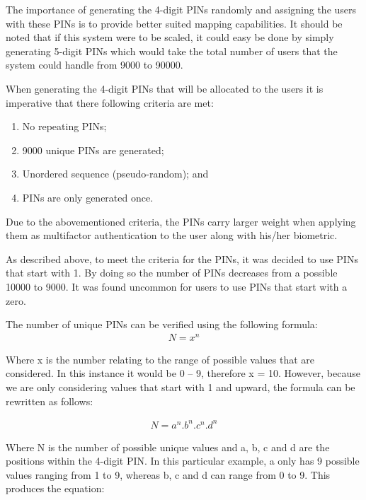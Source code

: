 The importance of generating the 4-digit PINs randomly and assigning the users with these PINs is to provide better suited mapping capabilities. It should be noted that if this system were to be scaled, it could easy be done by simply generating 5-digit PINs which would take the total number of users that the system could handle from 9000 to 90000.

When generating the 4-digit PINs that will be allocated to the users it is imperative that there following criteria are met:

\begin{enumerate}[label=\roman*.]
    \item No repeating PINs;
    \item 9000 unique PINs are generated;
    \item Unordered sequence (pseudo-random); and
    \item PINs are only generated once.
\end{enumerate}





Due to the abovementioned criteria, the PINs carry larger weight when applying them as multifactor authentication to the user along with his/her biometric. 

As described above, to meet the criteria for the PINs, it was decided to use PINs that start with 1. By doing so the number of PINs decreases from a possible 10000 to 9000. It was found uncommon for users to use PINs that start with a zero. 

The number of unique PINs can be verified using the following formula:
\begin{gather}
    N =  x^{n}    
\end{gather}


Where x is the number relating to the range of possible values that are considered. In this instance it would be 0 – 9, therefore x = 10. However, because we are only considering values that start with 1 and upward, the formula can be rewritten as follows:

\begin{gather}
    N = a^{n}.b^{n}.c^{n}.d^{n}    
\end{gather}


Where N is the number of possible unique values and a, b, c and d are the positions within the 4-digit PIN. In this particular example, a only has 9 possible values ranging from 1 to 9, whereas b, c and d can range from 0 to 9. This produces the equation:


